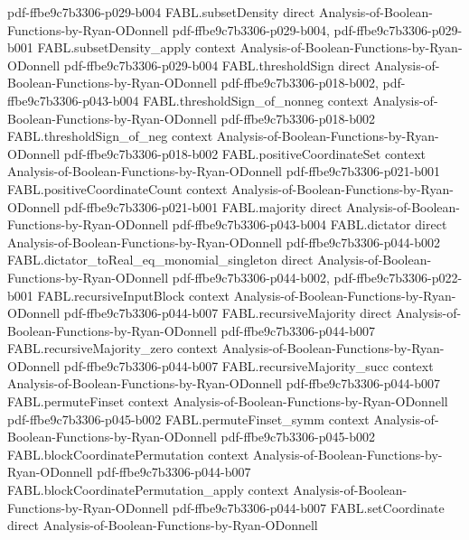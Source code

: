 \begin{theorem}
  {pdf-ffbe9c7b3306-p029-b004}
\proofstep
  {FABL.subsetDensity}
  {direct}
  {Analysis-of-Boolean-Functions-by-Ryan-ODonnell}
  {pdf-ffbe9c7b3306-p029-b004,
    pdf-ffbe9c7b3306-p029-b001}
\proofstep
  {FABL.subsetDensity_apply}
  {context}
  {Analysis-of-Boolean-Functions-by-Ryan-ODonnell}
  {pdf-ffbe9c7b3306-p029-b004}
\proofstep
  {FABL.thresholdSign}
  {direct}
  {Analysis-of-Boolean-Functions-by-Ryan-ODonnell}
  {pdf-ffbe9c7b3306-p018-b002,
    pdf-ffbe9c7b3306-p043-b004}
\proofstep
  {FABL.thresholdSign_of_nonneg}
  {context}
  {Analysis-of-Boolean-Functions-by-Ryan-ODonnell}
  {pdf-ffbe9c7b3306-p018-b002}
\proofstep
  {FABL.thresholdSign_of_neg}
  {context}
  {Analysis-of-Boolean-Functions-by-Ryan-ODonnell}
  {pdf-ffbe9c7b3306-p018-b002}
\proofstep
  {FABL.positiveCoordinateSet}
  {context}
  {Analysis-of-Boolean-Functions-by-Ryan-ODonnell}
  {pdf-ffbe9c7b3306-p021-b001}
\proofstep
  {FABL.positiveCoordinateCount}
  {context}
  {Analysis-of-Boolean-Functions-by-Ryan-ODonnell}
  {pdf-ffbe9c7b3306-p021-b001}
\proofstep
  {FABL.majority}
  {direct}
  {Analysis-of-Boolean-Functions-by-Ryan-ODonnell}
  {pdf-ffbe9c7b3306-p043-b004}
\proofstep
  {FABL.dictator}
  {direct}
  {Analysis-of-Boolean-Functions-by-Ryan-ODonnell}
  {pdf-ffbe9c7b3306-p044-b002}
\proofstep
  {FABL.dictator_toReal_eq_monomial_singleton}
  {direct}
  {Analysis-of-Boolean-Functions-by-Ryan-ODonnell}
  {pdf-ffbe9c7b3306-p044-b002,
    pdf-ffbe9c7b3306-p022-b001}
\proofstep
  {FABL.recursiveInputBlock}
  {context}
  {Analysis-of-Boolean-Functions-by-Ryan-ODonnell}
  {pdf-ffbe9c7b3306-p044-b007}
\proofstep
  {FABL.recursiveMajority}
  {direct}
  {Analysis-of-Boolean-Functions-by-Ryan-ODonnell}
  {pdf-ffbe9c7b3306-p044-b007}
\proofstep
  {FABL.recursiveMajority_zero}
  {context}
  {Analysis-of-Boolean-Functions-by-Ryan-ODonnell}
  {pdf-ffbe9c7b3306-p044-b007}
\proofstep
  {FABL.recursiveMajority_succ}
  {context}
  {Analysis-of-Boolean-Functions-by-Ryan-ODonnell}
  {pdf-ffbe9c7b3306-p044-b007}
\proofstep
  {FABL.permuteFinset}
  {context}
  {Analysis-of-Boolean-Functions-by-Ryan-ODonnell}
  {pdf-ffbe9c7b3306-p045-b002}
\proofstep
  {FABL.permuteFinset_symm}
  {context}
  {Analysis-of-Boolean-Functions-by-Ryan-ODonnell}
  {pdf-ffbe9c7b3306-p045-b002}
\proofstep
  {FABL.blockCoordinatePermutation}
  {context}
  {Analysis-of-Boolean-Functions-by-Ryan-ODonnell}
  {pdf-ffbe9c7b3306-p044-b007}
\proofstep
  {FABL.blockCoordinatePermutation_apply}
  {context}
  {Analysis-of-Boolean-Functions-by-Ryan-ODonnell}
  {pdf-ffbe9c7b3306-p044-b007}
\proofstep
  {FABL.setCoordinate}
  {direct}
  {Analysis-of-Boolean-Functions-by-Ryan-ODonnell}

\end{theorem}
